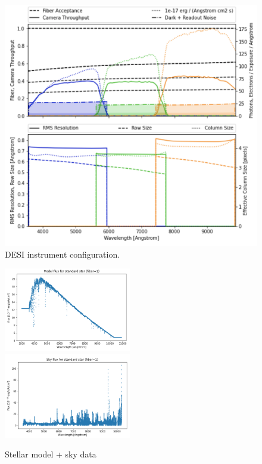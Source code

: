 \begin{figure}[h]
\centering
\includegraphics[width=12cm]{images/specsim/desi_config.png}
\caption{DESI instrument configuration.}
\label{fig:desi_config}
\end{figure}


\begin{figure}[h]
    \centering
    \includegraphics[width=0.495\textwidth]{images/specsim/stellar_model_4055_55359_1.png}
    \includegraphics[width=0.495\textwidth]{images/specsim/sky_flux_4055_55359_1.png}
    \caption{Stellar model + sky data}
    \label{fig:star_sky}
\end{figure}


